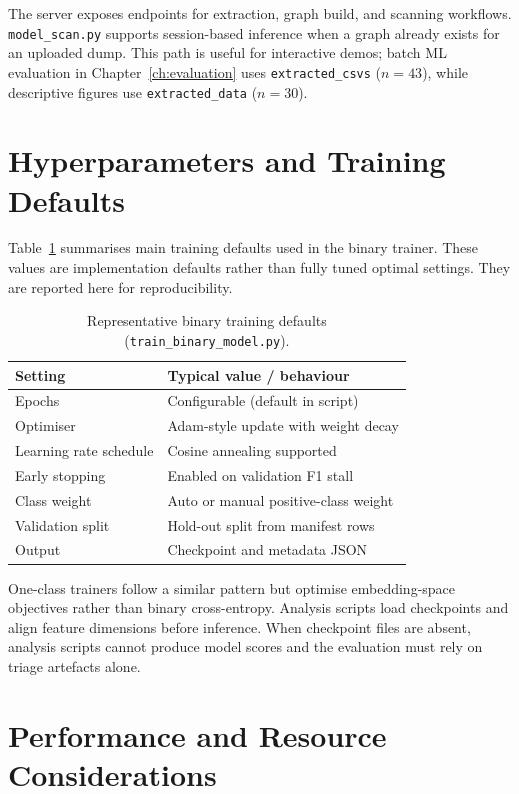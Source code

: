 The server exposes endpoints for extraction, graph build, and scanning workflows. \texttt{model\_scan.py} supports session-based inference when a graph already exists for an uploaded dump. This path is useful for interactive demos; batch ML evaluation in Chapter~\ref{ch:evaluation} uses \texttt{extracted\_csvs} ($n{=}43$), while descriptive figures use \texttt{extracted\_data} ($n{=}30$).

\section{Hyperparameters and Training Defaults}

Table~\ref{tab:hyperparams} summarises main training defaults used in the binary trainer. These values are implementation defaults rather than fully tuned optimal settings. They are reported here for reproducibility.

\begin{table}[htbp]
\centering
\caption{Representative binary training defaults (\texttt{train\_binary\_model.py}).}
\label{tab:hyperparams}
\begin{tabular}{ll}
\toprule
\textbf{Setting} & \textbf{Typical value / behaviour} \\
\midrule
Epochs & Configurable (default in script) \\
Optimiser & Adam-style update with weight decay \\
Learning rate schedule & Cosine annealing supported \\
Early stopping & Enabled on validation F1 stall \\
Class weight & Auto or manual positive-class weight \\
Validation split & Hold-out split from manifest rows \\
Output & Checkpoint and metadata JSON \\
\bottomrule
\end{tabular}
\end{table}

One-class trainers follow a similar pattern but optimise embedding-space objectives rather than binary cross-entropy. Analysis scripts load checkpoints and align feature dimensions before inference. When checkpoint files are absent, analysis scripts cannot produce model scores and the evaluation must rely on triage artefacts alone.

\section{Performance and Resource Considerations}

